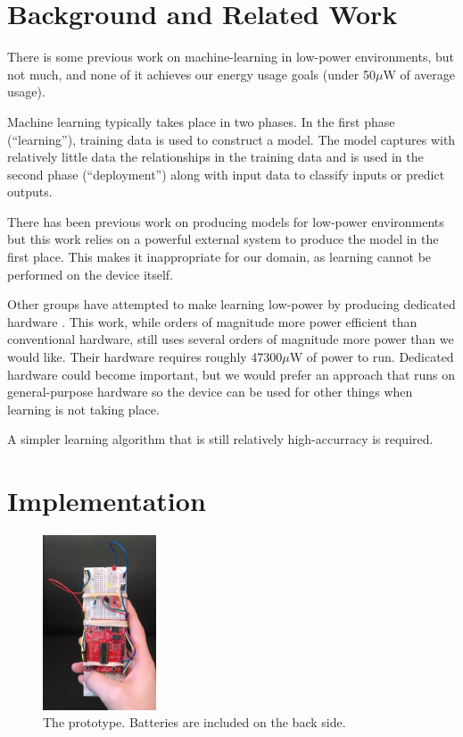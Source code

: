 \documentclass[12pt]{article}
\begin{document}
\section{Background and Related Work}

There is some previous work on machine-learning in low-power environments,
but not much, and none of it achieves our energy usage goals (under 50{$\mu$}W
of average usage).

Machine learning typically takes place in two phases. In the first phase
(``learning''), training data is used to construct a model. The model captures
with relatively little data the relationships in the training data and is used
in the second phase (``deployment'') along with input data to classify inputs
or predict outputs.

There has been previous work on producing models for low-power environments
\cite{low-power-models} but this work relies on a powerful external system to
produce the model in the first place. This makes it inappropriate for our
domain, as learning cannot be performed on the device itself.

Other groups have attempted to make learning low-power by producing dedicated
hardware \cite{ml-on-a-chip}. This work, while orders of magnitude more
power efficient than conventional hardware, still uses several
orders of magnitude more power than we would like. Their hardware requires
roughly 47300{$\mu$}W of power to run. Dedicated hardware could become
important, but we would prefer an approach that runs on general-purpose
hardware so the device can be used for other things when learning is not taking
place.

A simpler learning algorithm that is still relatively high-accurracy is
required.

\section{Implementation}

\begin{figure}[h!]
  \begin{center}
    \includegraphics[width=0.3\textwidth]{device-original.jpg}
  \caption{The prototype. Batteries are included on the back side.}
  \end{center}
\end{figure}
\end{document}
